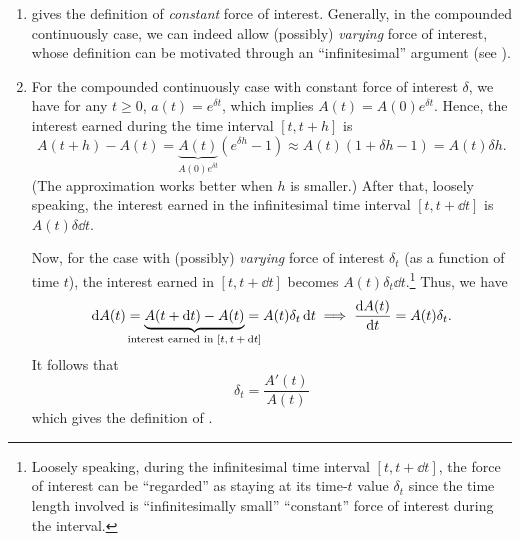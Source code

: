 \begin{enumerate}
\item {} gives the definition of \emph{constant} force of
interest. Generally, in the compounded continuously case, we can indeed allow
(possibly) \emph{varying} force of interest, whose definition can be motivated
through an ``infinitesimal'' argument (see
).

\item \label{it:varying-foi-motivation}
For the compounded continuously case with constant force of interest
\(\delta\), we have for any \(t\ge 0\), \(a(t)=e^{\delta t}\), which implies
\(A(t)=A(0)e^{\delta t}\). Hence, the interest earned during the time interval
\([t, t+h]\) is
\[
A(t+h)-A(t)=\underbrace{A(t)}_{A(0)e^{\delta t}}(e^{\delta h}-1)
\approx A(t)(1+\delta h-1)=A(t)\delta h.
\]
(The approximation works better when \(h\) is smaller.)
After that, loosely speaking, the interest earned in the infinitesimal time
interval \([t,t+\dd{t}]\) is \(A(t)\delta\dd{t}\).

Now, for the case with (possibly) \emph{varying} force of interest \(\delta_t\)
(as a function of time \(t\)), the interest earned in \([t,t+\dd{t}]\) becomes
\(A(t)\delta_t\dd{t}\).\footnote{Loosely speaking, during the infinitesimal
time interval \([t,t+\dd{t}]\), the force of interest can be ``regarded'' as
staying at its time-\(t\) value \(\delta_t\) since the time length involved is
``infinitesimally small''  ``constant'' force of interest
during the interval.} Thus, we have
\[
\dd{A(t)}=\underbrace{A(t+\dd{t})-A(t)}_{\mathclap{\text{interest earned in \([t,t+\dd{t}]\)}}}=A(t)\delta_t\dd{t}
\implies
\dv{A(t)}{t}=A(t)\delta_t.
\]
It follows that
\[
\delta_t=\frac{A'(t)}{A(t)}
\]
which gives the definition of .


\end{enumerate}
